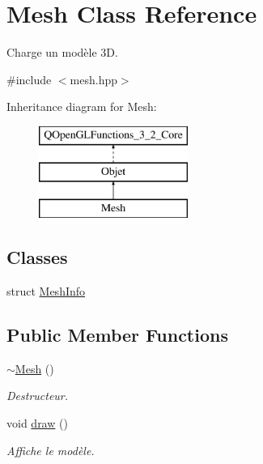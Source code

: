 \hypertarget{class_mesh}{\section{Mesh Class Reference}
\label{class_mesh}
}


Charge un modèle 3\+D.  




{\ttfamily \#include $<$mesh.\+hpp$>$}

Inheritance diagram for Mesh\+:\begin{figure}[H]
\begin{center}
\leavevmode
\includegraphics[height=3.000000cm]{class_mesh}
\end{center}
\end{figure}
\subsection*{Classes}
\begin{DoxyCompactItemize}
\item 
struct \hyperlink{struct_mesh_1_1_mesh_info}{Mesh\+Info}
\end{DoxyCompactItemize}
\subsection*{Public Member Functions}
\begin{DoxyCompactItemize}
\item 
\hyperlink{class_mesh_a5efe4da1a4c0971cfb037bd70304c303}{$\sim$\+Mesh} ()
\begin{DoxyCompactList}\small\item\em Destructeur. \end{DoxyCompactList}\item 
void \hyperlink{class_mesh_a996a8668fa2ca7d95d6d10744c833bc8}{draw} ()
\begin{DoxyCompactList}\small\item\em Affiche le modèle. \end{DoxyCompactList}\end{DoxyCompactItemize}
